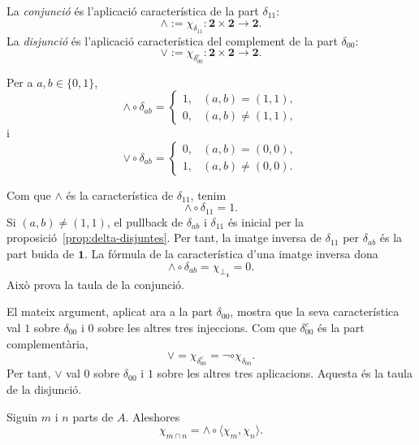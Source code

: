 \begin{definicio}\label{def:conjuncio-disjuncio}
La \emph{conjunció} és l'aplicació característica de la part
\(\delta_{11}\):
\[
\wedge:=\chi_{\delta_{11}}:
\mathbf2\times\mathbf2\to\mathbf2.
\]
La \emph{disjunció} és l'aplicació característica del complement de la
part \(\delta_{00}\):
\[
\vee:=\chi_{\delta_{00}^{c}}:
\mathbf2\times\mathbf2\to\mathbf2.
\]
\end{definicio}

\begin{proposicio}\label{prop:taules-veritat}
Per a \(a,b\in\{0,1\}\),
\[
\wedge\circ\delta_{ab}
=
\begin{cases}
1,&(a,b)=(1,1),\\
0,&(a,b)\neq(1,1),
\end{cases}
\]
i
\[
\vee\circ\delta_{ab}
=
\begin{cases}
0,&(a,b)=(0,0),\\
1,&(a,b)\neq(0,0).
\end{cases}
\]
\end{proposicio}

\begin{prova}
Com que \(\wedge\) és la característica de \(\delta_{11}\), tenim
\[
\wedge\circ\delta_{11}=1.
\]
Si \((a,b)\neq(1,1)\), el pullback de \(\delta_{ab}\) i
\(\delta_{11}\) és inicial per la proposició~\ref{prop:delta-disjuntes}. Per tant, la imatge inversa de
\(\delta_{11}\) per \(\delta_{ab}\) és la part buida de
\(\mathbf1\). La fórmula de la característica d'una imatge inversa
dona
\[
\wedge\circ\delta_{ab}
=\chi_{\bot_{\mathbf1}}
=0.
\]
Això prova la taula de la conjunció.

El mateix argument, aplicat ara a la part \(\delta_{00}\), mostra
que la seva característica val \(1\) sobre \(\delta_{00}\) i
\(0\) sobre les altres tres injeccions. Com que
\(\delta_{00}^{c}\) és la part complementària,
\[
\vee=\chi_{\delta_{00}^{c}}
=\neg\circ\chi_{\delta_{00}}.
\]
Per tant, \(\vee\) val \(0\) sobre \(\delta_{00}\) i
\(1\) sobre les altres tres aplicacions. Aquesta és la taula de la
disjunció.
\end{prova}

\begin{proposicio}\label{prop:caracteristica-interseccio}
Siguin \(m\) i \(n\) parts de \(A\). Aleshores
\[
\chi_{m\cap n}
=
\wedge\circ\langle\chi_m,\chi_n\rangle.
\]
\end{proposicio}

